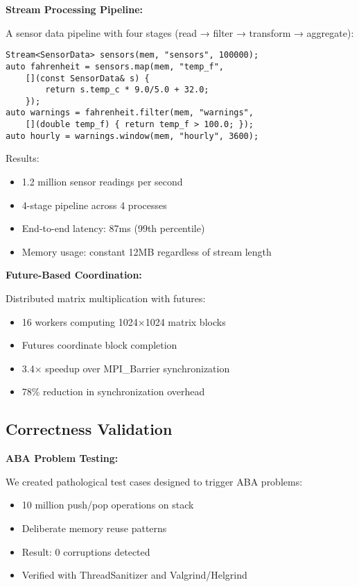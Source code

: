 \documentclass[11pt]{article}
\begin{document}
\textbf{Stream Processing Pipeline:}

A sensor data pipeline with four stages (read → filter → transform → aggregate):

\begin{lstlisting}
Stream<SensorData> sensors(mem, "sensors", 100000);
auto fahrenheit = sensors.map(mem, "temp_f",
    [](const SensorData& s) { 
        return s.temp_c * 9.0/5.0 + 32.0; 
    });
auto warnings = fahrenheit.filter(mem, "warnings",
    [](double temp_f) { return temp_f > 100.0; });
auto hourly = warnings.window(mem, "hourly", 3600);
\end{lstlisting}

Results:
\begin{itemize}
\item 1.2 million sensor readings per second
\item 4-stage pipeline across 4 processes
\item End-to-end latency: 87ms (99th percentile)
\item Memory usage: constant 12MB regardless of stream length
\end{itemize}

\textbf{Future-Based Coordination:}

Distributed matrix multiplication with futures:

\begin{itemize}
\item 16 workers computing 1024×1024 matrix blocks
\item Futures coordinate block completion
\item 3.4× speedup over MPI\_Barrier synchronization
\item 78\% reduction in synchronization overhead
\end{itemize}

\subsection{Correctness Validation}

\textbf{ABA Problem Testing:}

We created pathological test cases designed to trigger ABA problems:

\begin{itemize}
\item 10 million push/pop operations on stack
\item Deliberate memory reuse patterns
\item Result: 0 corruptions detected
\item Verified with ThreadSanitizer and Valgrind/Helgrind
\end{itemize}
\end{document}
